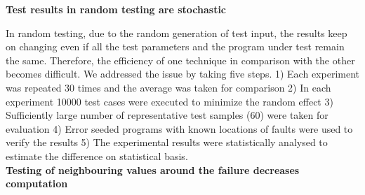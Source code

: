 








\textbf{Test results in random testing are stochastic} 

In random testing, due to the random generation of test input, the results keep on changing even if all the test parameters and the program under test remain the same. Therefore, the efficiency of one technique in comparison with the other becomes difficult. We addressed  the issue by taking five steps. 1) Each experiment was repeated 30 times and the average was taken for comparison 2) In each experiment 10000 test cases were executed to minimize the random effect 3) Sufficiently large number of representative test samples (60) were taken for evaluation 4) Error seeded programs with known locations of faults were used to verify the results 5) The experimental results were statistically analysed to estimate the difference on statistical basis.\\


   
\textbf{Testing of neighbouring values around the failure decreases computation}

